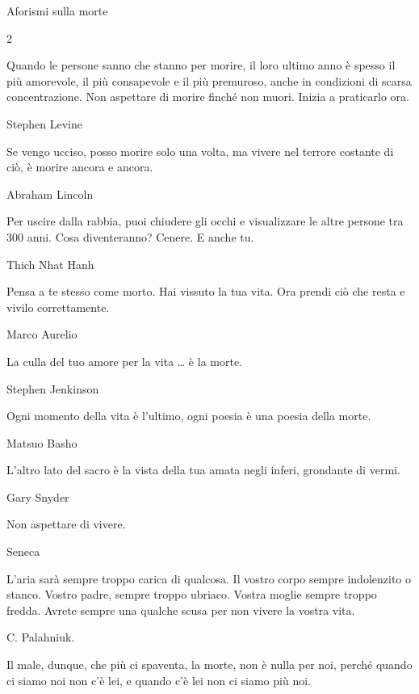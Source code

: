 \documentclass[12pt]{book} %
\begin{document}
\clearpage
\begin{mdframed}[linewidth=1pt]
Aforismi sulla morte

\begin{multicols}{2}

Quando le persone sanno che stanno per morire, il loro ultimo anno è spesso il più amorevole, il più consapevole e il
più premuroso, anche in condizioni di scarsa concentrazione. Non aspettare di morire finché non muori. Inizia a
praticarlo ora.

Stephen Levine


\bigskip

Se vengo ucciso, posso morire solo una volta, ma vivere nel terrore costante di ciò, è morire ancora e ancora.

Abraham Lincoln 


\bigskip

Per uscire dalla rabbia, puoi chiudere gli occhi e visualizzare le altre persone tra 300 anni. Cosa diventeranno?
Cenere. E anche tu.

Thich Nhat Hanh


\bigskip

Pensa a te stesso come morto. Hai vissuto la tua vita. Ora prendi ciò che resta e vivilo correttamente.

Marco Aurelio

\bigskip

La culla del tuo amore per la vita … è la morte.

Stephen Jenkinson


\bigskip

Ogni momento della vita è l'ultimo, ogni poesia è una poesia della morte.

Matsuo Basho


\bigskip

L'altro lato del sacro è la vista della tua amata negli inferi, grondante di vermi.

Gary Snyder

\bigskip

Non aspettare di vivere.

Seneca
\columnbreak

L'aria sarà sempre troppo carica di qualcosa. Il vostro corpo sempre indolenzito o stanco. Vostro padre, sempre troppo ubriaco. Vostra moglie sempre troppo fredda. Avrete sempre una qualche scusa per non vivere la vostra vita.

C. Palahniuk.


\bigskip

Il male, dunque, che più ci spaventa, la morte, non è nulla per noi, perché quando ci siamo noi non c'è lei, e quando c'è lei non ci siamo più noi. 


\end{multicols}
\end{mdframed}
\end{document}
